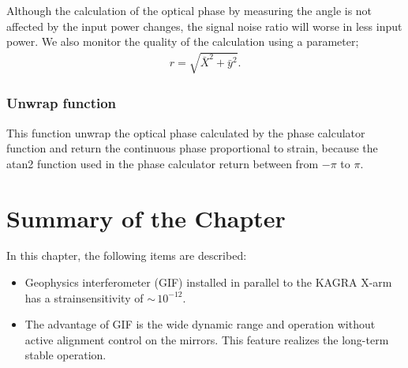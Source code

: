Although the calculation of the optical phase by measuring the angle is not affected by the input power changes, the signal noise ratio will worse in less input power. We also monitor the quality of the calculation using a parameter;
\begin{eqnarray}
  r = \sqrt{\bar{X}^2+{\bar{y}^2}}.
\end{eqnarray}

\subsubsection{Unwrap function}
This function unwrap the optical phase calculated by the phase calculator function and return the continuous phase proportional to strain, because the atan2 function used in the phase calculator return between from $-\pi$ to $\pi$. 

\section{Summary of the Chapter} 
In this chapter, the following items are described:
\begin{itemize}
\item Geophysics interferometer (GIF) installed in parallel to the KAGRA X-arm has a strainsensitivity of $\sim\,10^{-12}$.
\item The advantage of GIF is the wide dynamic range and operation without active alignment control on the mirrors. This feature realizes the long-term stable operation.
\end{itemize}
